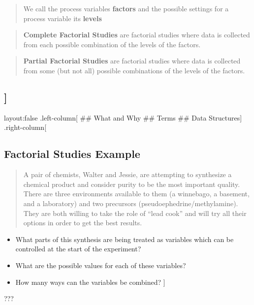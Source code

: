 \documentclass[]{article}
\begin{document}
\begin{quote}
We call the process variables \textbf{factors} and the possible settings
for a process variable its \textbf{levels}
\end{quote}

\begin{quote}
\textbf{Complete Factorial Studies} are factorial studies where data is
collected from each possible combination of the levels of the factors.
\end{quote}

\begin{quote}
\textbf{Partial Factorial Studies} are factorial studies where data is
collected from some (but not all) possible combinations of the levels of
the factors.
\end{quote}

\subsection{{]}}\label{section-2}

layout:false .left-column{[} \#\# What and Why \#\# Terms \#\# Data
Structures{]} .right-column{[}

\subsection{Factorial Studies Example}\label{factorial-studies-example}

\begin{quote}
A pair of chemists, Walter and Jessie, are attempting to synthesize a
chemical product and consider purity to be the most important quality.
There are three environments available to them (a winnebago, a basement,
and a laboratory) and two precursors (pseudoephedrine/methylamine). They
are both willing to take the role of ``lead cook'' and will try all
their options in order to get the best results.
\end{quote}

\begin{itemize}
\item
  What parts of this synthesis are being treated as variables which can
  be controlled at the start of the experiment?
\item
  What are the possible values for each of these variables?
\item
  How many ways can the variables be combined? {]}
\end{itemize}

???
\end{document}
